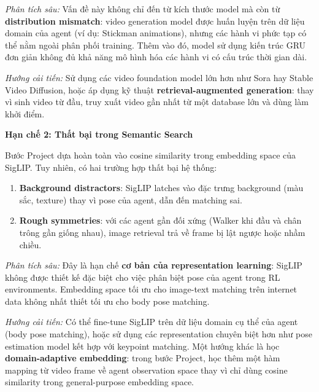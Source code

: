 \textit{Phân tích sâu:} Vấn đề này không chỉ đến từ kích thước model
mà còn từ \textbf{distribution mismatch}: video generation model được
huấn luyện trên dữ liệu domain của agent (ví dụ: Stickman animations),
nhưng các hành vi phức tạp có thể nằm ngoài phân phối training. Thêm
vào đó, model sử dụng kiến trúc GRU đơn giản không đủ khả năng mô hình
hóa các hành vi có cấu trúc thời gian dài.

\textit{Hướng cải tiến:} Sử dụng các video foundation model lớn hơn
như Sora hay Stable Video Diffusion, hoặc áp dụng kỹ thuật
\textbf{retrieval-augmented generation}: thay vì sinh video từ đầu,
truy xuất video gần nhất từ một database lớn và dùng làm khởi điểm.

\textbf{Hạn chế 2: Thất bại trong Semantic Search}

Bước Project dựa hoàn toàn vào cosine similarity trong embedding space
của SigLIP. Tuy nhiên, có hai trường hợp thất bại hệ thống:

\begin{enumerate}
    \item \textbf{Background distractors}: SigLIP latches vào đặc
    trưng background (màu sắc, texture) thay vì pose của agent, dẫn
    đến matching sai.
    \item \textbf{Rough symmetries}: với các agent gần đối xứng (Walker
    khi đầu và chân trông gần giống nhau), image retrieval trả về
    frame bị lật ngược hoặc nhầm chiều.
\end{enumerate}

\textit{Phân tích sâu:} Đây là hạn chế \textbf{cơ bản của
representation learning}: SigLIP không được thiết kế đặc biệt cho
việc phân biệt pose của agent trong RL environments. Embedding space
tối ưu cho image-text matching trên internet data không nhất thiết tối
ưu cho body pose matching.

\textit{Hướng cải tiến:} Có thể fine-tune SigLIP trên dữ liệu domain
cụ thể của agent (body pose matching), hoặc sử dụng các representation
chuyên biệt hơn như pose estimation model kết hợp với keypoint
matching. Một hướng khác là học \textbf{domain-adaptive embedding}:
trong bước Project, học thêm một hàm mapping từ video frame về agent
observation space thay vì chỉ dùng cosine similarity trong
general-purpose embedding space.